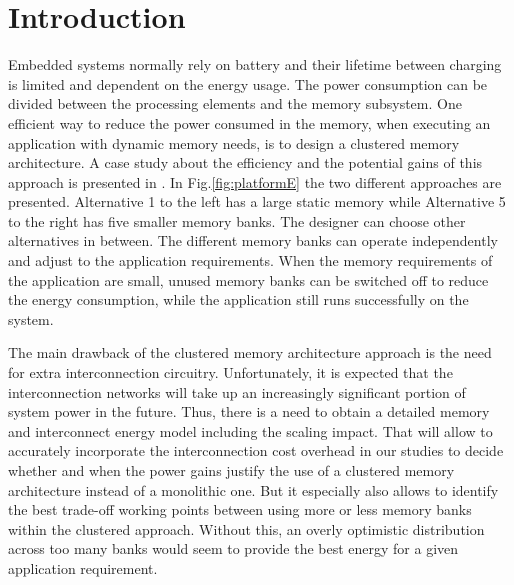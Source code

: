 \section{Introduction}

Embedded systems normally rely on battery and their lifetime between charging is limited and dependent on the energy usage.
The power consumption can be divided between the processing elements and the memory subsystem.
One efficient way to reduce the power consumed in the memory, when executing an application with dynamic memory needs, is to design a clustered memory architecture.
A case study about the efficiency and the potential gains of this approach is presented in \cite{filippopoulos2013exploration}.
In Fig.\ref{fig:platformE} the two different approaches are presented.
Alternative 1 to the left has a large static memory while Alternative 5 to the right has five smaller memory banks. The designer can choose other alternatives in between.
The different memory banks can operate independently and  adjust to the application requirements.
When the memory requirements of the application are small, unused memory banks can be switched off to reduce the energy consumption, while the application still runs successfully on the system. 
 
 The main drawback of the clustered memory architecture approach is the need for extra interconnection circuitry.
 Unfortunately, it is expected that the interconnection networks will take up an increasingly significant portion of system power in the future. 
Thus, there is a need to obtain a detailed memory and interconnect energy model including the scaling impact. 
That will allow to accurately incorporate the interconnection cost overhead in our studies to decide whether and when the power gains justify the use of a clustered memory architecture instead of a monolithic one. 
But it especially also allows to identify the best trade-off working points between using more
or less memory banks within the clustered approach. 
Without this, an overly optimistic distribution across too many banks would seem to provide the best energy for a given application requirement.
  
